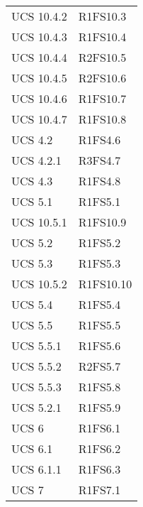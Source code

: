 {\begin{longtable}{ C{4cm} C{4cm}}

UCS 10.4.2 & R1FS10.3\\

UCS 10.4.3 & R1FS10.4\\

UCS 10.4.4 & R2FS10.5\\

UCS 10.4.5 & R2FS10.6\\

UCS 10.4.6 & R1FS10.7\\

UCS 10.4.7 & R1FS10.8\\

UCS 4.2 & R1FS4.6\\


UCS 4.2.1 & R3FS4.7\\

UCS 4.3 & R1FS4.8\\

UCS 5.1 & R1FS5.1\\

UCS 10.5.1 & R1FS10.9\\

UCS 5.2 & R1FS5.2\\

UCS 5.3 & R1FS5.3\\

UCS 10.5.2 & R1FS10.10\\

UCS 5.4 & R1FS5.4\\

UCS 5.5 & R1FS5.5\\


UCS 5.5.1 & R1FS5.6\\

UCS 5.5.2 & R2FS5.7\\

UCS 5.5.3 & R1FS5.8\\

UCS 5.2.1 & R1FS5.9\\

UCS 6 & R1FS6.1\\

UCS 6.1 & R1FS6.2\\

UCS 6.1.1 & R1FS6.3\\

UCS 7 & R1FS7.1\\


\end{longtable}}
